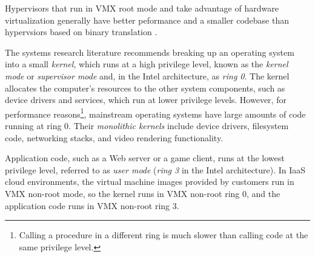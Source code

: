 Hypervisors that run in VMX root mode and take advantage of hardware
virtualization generally have better peformance and a smaller codebase than
hypervsiors based on binary translation \cite{rosenblum2005virtualization}.

The systems research literature recommends breaking up an operating system into
a small \textit{kernel}, which runs at a high privilege level, known as the
\textit{kernel mode} or \textit{supervisor mode} and, in the Intel
architecture, as \textit{ring 0}. The kernel allocates the computer's resources
to the other system components, such as device drivers and services, which run
at lower privilege levels. However, for performance reasons\footnote{Calling a
procedure in a different ring is much slower than calling code at the same
privilege level.}, mainstream operating systems have large amounts of code
running at ring 0. Their \textit{monolithic kernels} include device drivers,
filesystem code, networking stacks, and video rendering functionality.

Application code, such as a Web server or a game client, runs at the lowest
privilege level, referred to as \textit{user mode} (\textit{ring 3} in the
Intel architecture). In IaaS cloud environments, the virtual machine images
provided by customers run in VMX non-root mode, so the kernel runs in VMX
non-root ring 0, and the application code runs in VMX non-root ring 3.
